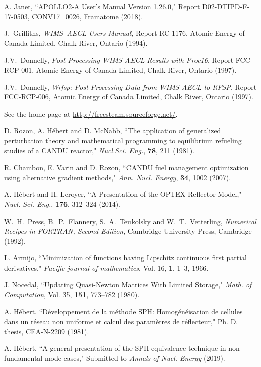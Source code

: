 \begin{thebibliography}{99}
A. Janet, ``APOLLO2-A User's Manual Version 1.26.0," Report D02-DTIPD-F-17-0503, CONV17\_0026, Framatome (2018).

J.~Griffiths,  
\textsl{WIMS--AECL Users Manual},
Report RC-1176, Atomic Energy of Canada Limited, Chalk River, Ontario (1994).

J.V.~Donnelly,  
\textsl{Post-Processing WIMS-AECL Results with Proc16},
Report FCC-RCP-001, Atomic Energy of Canada Limited, Chalk River, Ontario (1997).

J.V.~Donnelly,  
\textsl{Wrfsp: Post-Processing Data from WIMS-AECL to RFSP},
Report FCC-RCP-006, Atomic Energy of Canada Limited, Chalk River, Ontario (1997).

See the home page at \url{http://freesteam.sourceforge.net/}.

D. Rozon, A. H\'ebert and D. McNabb, ``The application of generalized perturbation theory and mathematical programming
to equilibrium refueling studies of a CANDU reactor," {\sl Nucl.Sci. Eng.}, {\bf 78}, 211 (1981).

R. Chambon, E. Varin and D. Rozon, ``CANDU fuel management optimization using alternative gradient
methods," {\sl Ann. Nucl. Energy}, {\bf 34}, 1002 (2007).

A. H\'ebert and H. Leroyer, ``A Presentation of the OPTEX Reflector Model," {\sl Nucl. Sci. Eng.},  {\bf 176}, 312--324 (2014).

W.~H.~Press, B.~P.~Flannery, S.~A.~Teukolsky and W.~T.~Vetterling, {\sl Numerical Recipes in FORTRAN, Second Edition}, Cambridge University Press, Cambridge (1992).

L. Armijo, ``Minimization of functions having Lipschitz continuous
first partial derivatives," {\sl Pacific journal of mathematics}, Vol. 16,
{\bf 1}, 1--3, 1966.

J. Nocedal, ``Updating Quasi-Newton Matrices With Limited Storage," {\sl Math. of Computation}, Vol. 35, {\bf 151}, 773--782 (1980).

A. H\'ebert, ``D\'eveloppement de la m\'ethode SPH: Homog\'en\'eisation de cellules dans un r\'eseau non uniforme et calcul des param\`etres de r\'eflecteur," Ph. D. thesis, CEA-N-2209 (1981).

A. H\'ebert, ``A general presentation of the SPH equivalence technique in non-fundamental mode cases," Submitted to {\sl Annals of Nucl. Energy} (2019).


\end{thebibliography}
